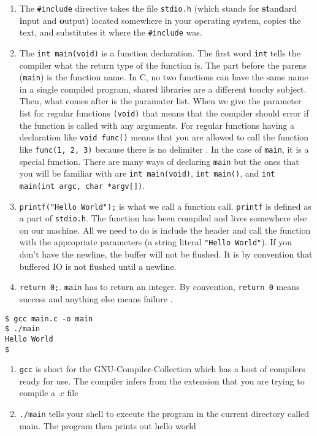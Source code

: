 \begin{enumerate}
  \item The \texttt{\#include} directive takes the file \texttt{stdio.h} (which stands for \textbf{st}an\textbf{d}ard \textbf{i}nput and \textbf{o}utput) located somewhere in your operating system, copies the text, and substitutes it where the \texttt{\#include} was.
  \item The \texttt{int main(void)} is a function declaration. The first word \texttt{int} tells the compiler what the return type of the function is. The part before the parens (\texttt{main}) is the function name. In C, no two functions can have the same name in a single compiled program, shared libraries are a different touchy subject. Then, what comes after is the paramater list. When we give the parameter list for regular functions \texttt{(void)} that means that the compiler should error if the function is called with any arguments. For regular functions having a declaration like \texttt{void func()} means that you are allowed to call the function like \texttt{func(1, 2, 3)} because there is no delimiter \cite{CITATION_NEEDED}. In the case of \texttt{main}, it is a special function. There are many ways of declaring \texttt{main} but the ones that you will be familiar with are \texttt{int main(void)}, \texttt{int main()}, and \texttt{int main(int argc, char *argv[])}.
  \item \texttt{printf("Hello World\n");} is what we call a function call. \texttt{printf} is defined as a part of \texttt{stdio.h}. The function has been compiled and lives somewhere else on our machine. All we need to do is include the header and call the function with the appropriate parameters (a string literal \texttt{"Hello World\n"}). If you don't have the newline, the buffer will not be flushed. It is by convention that buffered IO is not flushed until a newline. \cite{CITATION_NEEDED}
  \item \texttt{return 0;}. \texttt{main} has to return an integer. By convention, \texttt{return 0} means success and anything else means failure \cite{CITATION_NEEDED}.
\end{enumerate}

\begin{lstlisting}
$ gcc main.c -o main
$ ./main
Hello World
$
\end{lstlisting}

\begin{enumerate}
\item \texttt{gcc} is short for the GNU-Compiler-Collection which has a host of compilers ready for use. The compiler infers from the extension that you are trying to compile a .c file
\item \texttt{./main} tells your shell to execute the program in the current directory called main. The program then prints out hello world
\end{enumerate}

